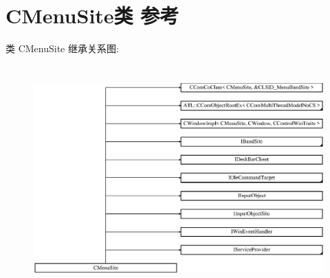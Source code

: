 \hypertarget{class_c_menu_site}{}\section{C\+Menu\+Site类 参考}
\label{class_c_menu_site}
类 C\+Menu\+Site 继承关系图\+:\begin{figure}[H]
\begin{center}
\leavevmode
\includegraphics[height=8.700564cm]{class_c_menu_site}
\end{center}
\end{figure}

